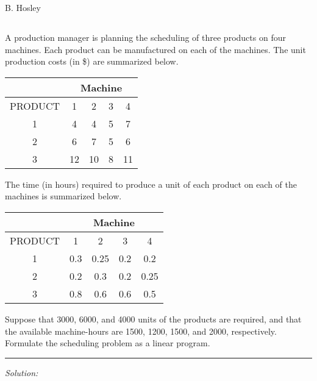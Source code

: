 \documentclass[12pt]{amsart}
\begin{document}
\raggedbottom

\hspace{\fill} {\large B. Hosley}
\bigskip


\setcounter{section}{1}
\setcounter{subsection}{12}
\subsection{}
A production manager is planning the scheduling of three products on four machines. 
Each product can be manufactured on each of the machines. 
The unit production costs (in \$) are summarized below. \\

\begin{center}
	\begin{tabular}{c|cccc}
		& \multicolumn{4}{c}{Machine} \\
		\midrule
		PRODUCT & 1 & 2 & 3 & 4 \\
		\midrule
		1 & 4 & 4 & 5 & 7 \\
		2 & 6 & 7 & 5 & 6 \\
		3 &12 &10 & 8 &11 
	\end{tabular}
\end{center} \phantom{text}

The time (in hours) required to produce a unit of each product on each of the machines is summarized below.

\begin{center}
	\begin{tabular}{c|cccc}
		& \multicolumn{4}{c}{Machine} \\
		\midrule
		PRODUCT & 1 & 2 & 3 & 4 \\
		\midrule
		1 & 0.3 & 0.25 & 0.2 & 0.2 \\
		2 & 0.2 & 0.3 & 0.2 & 0.25 \\
		3 & 0.8 & 0.6 & 0.6 & 0.5  
	\end{tabular} 
\end{center} \phantom{text}

Suppose that 3000, 6000, and 4000 units of the products are required, 
and that the available machine-hours are 1500, 1200, 1500, and 2000, respectively. 
Formulate the scheduling problem as a linear program. \\

\hrule
\medskip

\textit{Solution:} \\
\end{document}
